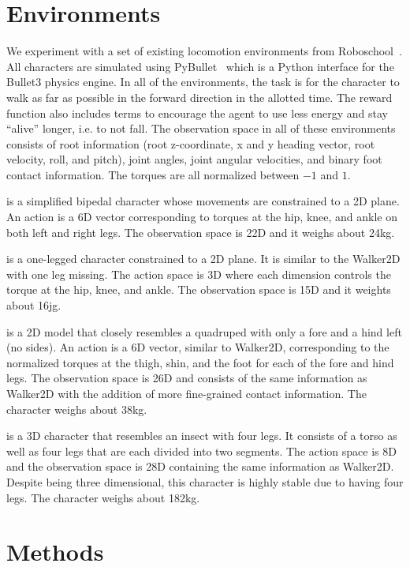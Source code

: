 \section{Environments}

We experiment with a set of existing locomotion environments from  Roboschool~\cite{ref:roboschool}. All characters are simulated using PyBullet~\cite{ref:Pybullet} which is a Python interface for the Bullet3 physics engine. In all of the environments, the task is for the character to walk as far as possible in the forward direction in the allotted time. The reward function also includes terms to encourage the agent to use less energy and stay ``alive'' longer, i.e. to not fall. The observation space in all of these environments consists of root information (root z-coordinate, x and y heading vector, root velocity, roll, and pitch), joint angles, joint angular velocities, and binary foot contact information. The torques are all normalized between $-1$ and $1$.

 is a simplified bipedal character whose movements are constrained to a 2D plane. An action is a 6D vector corresponding to torques at the hip, knee, and ankle on both left and right legs. The observation space is 22D and it weighs about 24kg.

 is a one-legged character constrained to a 2D plane. It is similar to the Walker2D with one leg missing. The action space is 3D where each dimension controls the torque at the hip, knee, and ankle. The observation space is 15D and it weights about 16jg.

 is a 2D model that closely resembles a quadruped with only a fore and a hind left (no sides). An action is a 6D vector, similar to Walker2D, corresponding to the normalized torques at the thigh, shin, and the foot for each of the fore and hind legs. The observation space is 26D and consists of the same information as Walker2D with the addition of more fine-grained contact information. The character weighs about 38kg.

 is a 3D character that resembles an insect with four legs. It consists of a torso as well as four legs that are each divided into two segments. The action space is 8D and the observation space is 28D containing the same information as Walker2D. Despite being three dimensional, this character is highly stable due to having four legs. The character weighs about 182kg.


\section{Methods}

